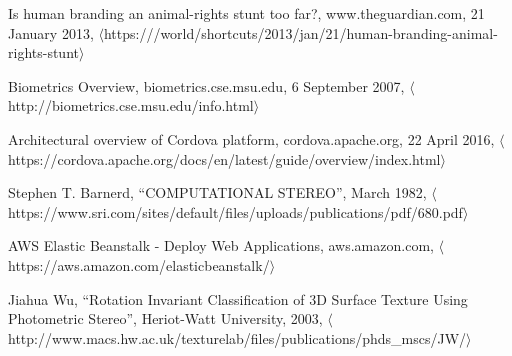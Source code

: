 \begin{thebibliography}{1}

  Is human branding an animal-rights stunt too far?,
  www.theguardian.com,
  21 January 2013,
  $\langle$https:///world/shortcuts/2013/jan/21/human-branding-animal-rights-stunt$\rangle$

  Biometrics Overview,
  biometrics.cse.msu.edu,
  6 September 2007,
  $\langle$http://biometrics.cse.msu.edu/info.html$\rangle$
  
  Architectural overview of Cordova platform,
  cordova.apache.org,
  22 April 2016,
  $\langle$https://cordova.apache.org/docs/en/latest/guide/overview/index.html$\rangle$

  Stephen T. Barnerd,
  ``COMPUTATIONAL STEREO'',
  March 1982,
  $\langle$https://www.sri.com/sites/default/files/uploads/publications/pdf/680.pdf$\rangle$

  AWS Elastic Beanstalk - Deploy Web Applications,
  aws.amazon.com,
  $\langle$https://aws.amazon.com/elasticbeanstalk/$\rangle$

  Jiahua Wu,
  ``Rotation Invariant Classification of 3D Surface Texture Using Photometric Stereo'',
  Heriot-Watt University,
  2003,
  $\langle$http://www.macs.hw.ac.uk/texturelab/files/publications/phds\_mscs/JW/$\rangle$


\end{thebibliography}
